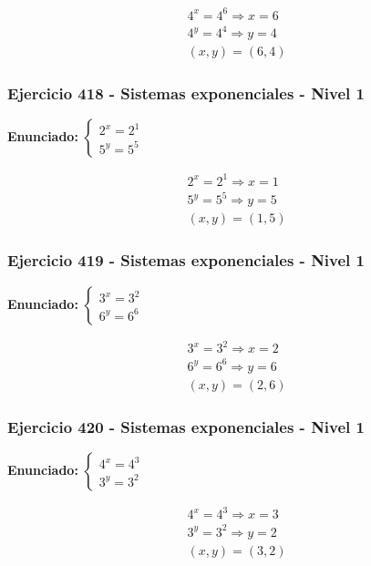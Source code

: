 \documentclass[12pt,a4paper]{article}
\begin{document}
\[
\begin{aligned}
4^x=4^{6}\Rightarrow x=6\\
4^y=4^{4}\Rightarrow y=4\\
\boxed{(x,y)=(6,4)}
\end{aligned}
\]


\subsubsection*{Ejercicio 418 - Sistemas exponenciales - Nivel 1}
\textbf{Enunciado:} \(\begin{cases} 2^x=2^{1}\\ 5^y=5^{5}\end{cases}\)

\[
\begin{aligned}
2^x=2^{1}\Rightarrow x=1\\
5^y=5^{5}\Rightarrow y=5\\
\boxed{(x,y)=(1,5)}
\end{aligned}
\]


\subsubsection*{Ejercicio 419 - Sistemas exponenciales - Nivel 1}
\textbf{Enunciado:} \(\begin{cases} 3^x=3^{2}\\ 6^y=6^{6}\end{cases}\)

\[
\begin{aligned}
3^x=3^{2}\Rightarrow x=2\\
6^y=6^{6}\Rightarrow y=6\\
\boxed{(x,y)=(2,6)}
\end{aligned}
\]


\subsubsection*{Ejercicio 420 - Sistemas exponenciales - Nivel 1}
\textbf{Enunciado:} \(\begin{cases} 4^x=4^{3}\\ 3^y=3^{2}\end{cases}\)

\[
\begin{aligned}
4^x=4^{3}\Rightarrow x=3\\
3^y=3^{2}\Rightarrow y=2\\
\boxed{(x,y)=(3,2)}
\end{aligned}
\]
\end{document}
